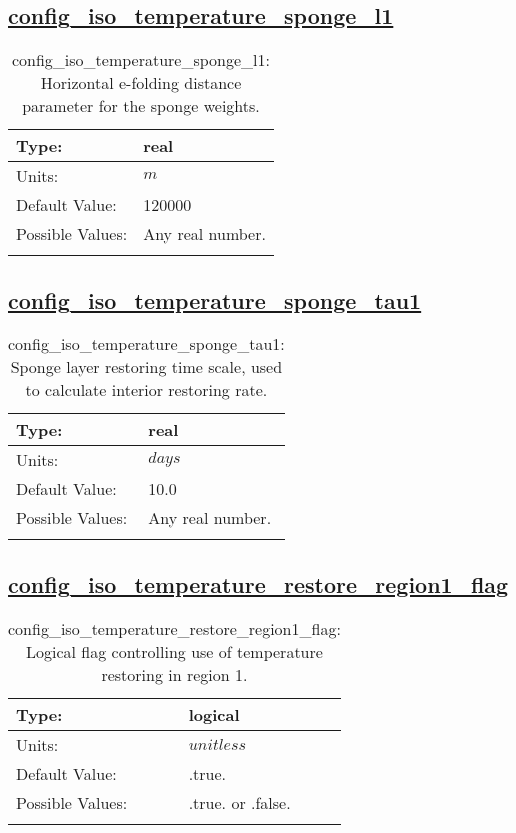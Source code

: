 \subsection[config\_iso\_temperature\_sponge\_l1]{\hyperref[sec:nm_tab_iso]{config\_iso\_temperature\_sponge\_l1}}
\label{subsec:nm_sec_config_iso_temperature_sponge_l1}
\begin{center}
\begin{longtable}{| p{2.0in} || p{4.0in} |}
    \hline
    Type: & real \\
    \hline
    Units: & $m$ \\
    \hline
    Default Value: & 120000 \\
    \hline
    Possible Values: & Any real number. \\
    \hline
    \caption{config\_iso\_temperature\_sponge\_l1: Horizontal e-folding distance parameter for the sponge weights.}
\end{longtable}
\end{center}
\subsection[config\_iso\_temperature\_sponge\_tau1]{\hyperref[sec:nm_tab_iso]{config\_iso\_temperature\_sponge\_tau1}}
\label{subsec:nm_sec_config_iso_temperature_sponge_tau1}
\begin{center}
\begin{longtable}{| p{2.0in} || p{4.0in} |}
    \hline
    Type: & real \\
    \hline
    Units: & $days$ \\
    \hline
    Default Value: & 10.0 \\
    \hline
    Possible Values: & Any real number. \\
    \hline
    \caption{config\_iso\_temperature\_sponge\_tau1: Sponge layer restoring time scale, used to calculate interior restoring rate.}
\end{longtable}
\end{center}
\subsection[config\_iso\_temperature\_restore\_region1\_flag]{\hyperref[sec:nm_tab_iso]{config\_iso\_temperature\_restore\_region1\_flag}}
\label{subsec:nm_sec_config_iso_temperature_restore_region1_flag}
\begin{center}
\begin{longtable}{| p{2.0in} || p{4.0in} |}
    \hline
    Type: & logical \\
    \hline
    Units: & $unitless$ \\
    \hline
    Default Value: & .true. \\
    \hline
    Possible Values: & .true. or .false. \\
    \hline
    \caption{config\_iso\_temperature\_restore\_region1\_flag: Logical flag controlling use of temperature restoring in region 1.}
\end{longtable}
\end{center}
